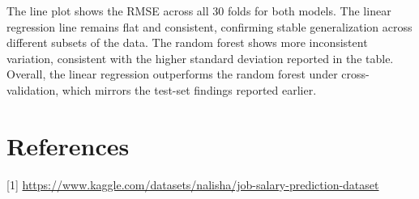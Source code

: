 \documentclass[
]{article}
\begin{document}
The line plot shows the RMSE across all 30 folds for both models. The
linear regression line remains flat and consistent, confirming stable
generalization across different subsets of the data. The random forest
shows more inconsistent variation, consistent with the higher standard
deviation reported in the table. Overall, the linear regression
outperforms the random forest under cross-validation, which mirrors the
test-set findings reported earlier.

\section{References}\label{references}

{[}1{]}
\url{https://www.kaggle.com/datasets/nalisha/job-salary-prediction-dataset}
\end{document}
